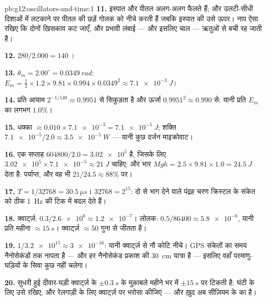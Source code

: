 \begin{solution}{pb:g12:oscillators-and-time:1}
\textbf{11.} इस्पात और पीतल अलग-अलग फैलते हैं; और उलटी-सीधी दिशाओं में लटकाने
पर पीतल की छड़ें गोलक को नीचे करती हैं जबकि इस्पात की उसे ऊपर। नाप ऐसा रखिए कि
दोनों खिसकाव कट जाएँ, और प्रभावी लंबाई --- और इसलिए चाल --- ऋतुओं से बची रह
जाती है।

\textbf{12.} $280/2.000 = 140$ ।

\textbf{13.} $\theta_m = 2.00^\circ = \qty{0.0349}{rad}$: $E_m =
\tfrac12 \times 1.2 \times 9.81 \times 0.994 \times 0.0349^2 \approx
\qty{7.1e-3}{J}$।

\textbf{14.} प्रति  आयाम $2^{-1/140} \approx
0.9951$ से सिकुड़ता है और
ऊर्जा $0.9951^2 \approx 0.990$ से: यानी प्रति  $E_m$ का लगभग
$1.0\%$।

\textbf{15.} धक्का $\approx 0.010 \times \num{7.1e-3} =
\qty{7.1e-5}{J}$; शक्ति $\num{7.1e-5}/2.0 \approx \qty{3.5e-5}{W}$ --- यानी कुछ दर्जन
माइक्रोवाट।

\textbf{16.} एक सप्ताह $604800/2.0 = \num{3.02e5}$  है, जिसके लिए $\num{3.02e5} \times \num{7.1e-5} \approx \qty{21}{J}$ चाहिए;
और भार $Mgh = 2.5 \times 9.81 \times 1.0 = \qty{24.5}{J}$ देता है: पर्याप्त, और वह भी $21/24.5 \approx 88\%$ 
पर।

\textbf{17.} $T = 1/\num{32768} = \qty{30.5}{\micro s}$। $\num{32768}
= 2^{15}$: दो से भाग देने वाले पंद्रह चरण क्रिस्टल के
संकेत को ठीक \qty{1}{Hz} की टिक में बदल देते हैं।

\textbf{18.} क्वार्ट्ज़: $0.3/\num{2.6e6} \approx \num{1.2e-7}$। लोलक: $0.5/86400 \approx \num{5.8e-6}$, यानी प्रति महीना $\approx
\qty{15}{s}$।
क्वार्ट्ज़ $\approx 50$ गुना से जीतता है।

\textbf{19.} $1/\num{3.2e15} \approx \num{3e-16}$: यानी क्वार्ट्ज़ से नौ कोटि नीचे। GPS संकेतों का
समय नैनोसेकंडों तक नापता है --- और हर नैनोसेकंड प्रकाश की \qty{30}{cm} यात्रा है
--- इसलिए वहाँ परमाणु-घड़ियों के सिवा कुछ नहीं चलेगा।

\textbf{20.} सुधरी हुई दीवार-घड़ी क्वार्ट्ज़ के $\pm\qty{0.3}{s}$ के मुक़ाबले महीने भर में
$\pm\qty{15}{s}$ पर टिकती है: घंटी के लिए उसे रखिए, और रेलगाड़ी के लिए क्वार्ट्ज़ पर
भरोसा कीजिए --- और  ख़ुद अब सीज़ियम के  का है।
\end{solution}
